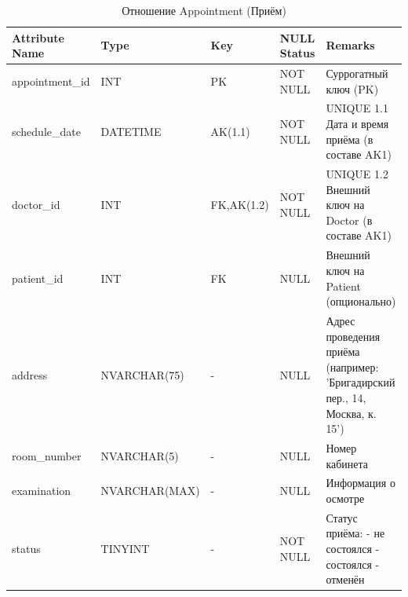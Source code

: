 \documentclass[a4paper, 14pt]{extarticle}
\begin{document}
\begin{table}[h!]
\captionsetup{singlelinecheck=false, position=top}
\caption{Отношение Appointment (Приём)}
\begin{tabularx}{\textwidth}{|l|l|l|l|Y|}
\hline
	\textbf{Attribute Name} & \textbf{Type} & \textbf{Key} & \textbf{NULL Status} & \textbf{Remarks}\\
\hline
appointment\_id & INT & PK & NOT NULL & Суррогатный ключ (PK)\\
\hline
schedule\_date & DATETIME & AK(1.1) & NOT NULL & UNIQUE 1.1 Дата и время приёма (в составе AK1)\\
\hline
doctor\_id & INT & FK,AK(1.2) & NOT NULL & UNIQUE 1.2 Внешний ключ на Doctor (в составе AK1)\\
\hline
patient\_id & INT & FK & NULL & Внешний ключ на Patient (опционально)\\
\hline
address & NVARCHAR(75) & - & NULL & Адрес проведения приёма (например: 'Бригадирский пер., 14, Москва, к. 15')\\
\hline
room\_number & NVARCHAR(5) & - & NULL & Номер кабинета\\
\hline
examination & NVARCHAR(MAX) & - & NULL & Информация о осмотре\\
\hline
status & TINYINT & - & NOT NULL & Статус приёма:  - не состоялся  - состоялся  - отменён
\\
\hline
\end{tabularx}
\end{table}
\end{document}
